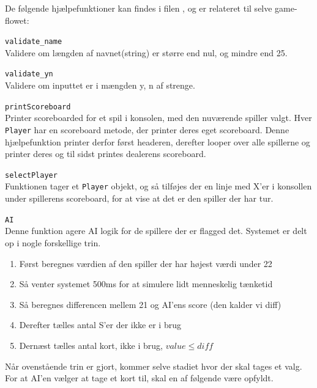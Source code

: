 \documentclass[a4paper]{article}
\begin{document}
      De følgende hjælpefunktioner kan findes i filen , og er relateret til selve game-flowet:
      \begin{description}
        \item{\texttt{validate\_name}}~\\
          Validere om længden af navnet(string) er større end nul,
          og mindre end 25.
      
        \item{\texttt{validate\_yn}}~\\
          Validere om inputtet er i mængden {y, n} af strenge.

        \item{\texttt{printScoreboard}}~\\
          Printer scoreboarded for et spil i konsolen, med den nuværende spiller valgt.
          Hver \texttt{Player} har en scoreboard metode, der printer deres eget scoreboard.
          Denne hjælpefunktion printer derfor først headeren, derefter looper over alle spillerne og printer deres
          og til sidst printes dealerens scoreboard.

        \item{\texttt{selectPlayer}}~\\
          Funktionen tager et \texttt{Player} objekt,
          og så tilføjes der en linje med X'er i konsollen under spillerens scoreboard,
          for at vise at det er den spiller der har tur.

        \item{\texttt{AI}}~\\
          Denne funktion agere AI logik for de spillere der er flagged det.
          Systemet er delt op i nogle forskellige trin.

          \begin{enumerate}
            \item Først beregnes værdien af den spiller der har højest værdi under 22
            \item Så venter systemet 500ms for at simulere lidt menneskelig tænketid
            \item Så beregnes differencen mellem 21 og AI'ens score (den kalder vi diff)
            \item Derefter tælles antal S'er der ikke er i brug
            \item Dernæst tælles antal kort, ikke i brug, $value \leq diff$
          \end{enumerate}

          Når ovenstående trin er gjort, kommer selve stadiet hvor der skal tages et valg.
          For at AI'en vælger at tage et kort til, skal en af følgende være opfyldt.


\end{description}
\end{document}
